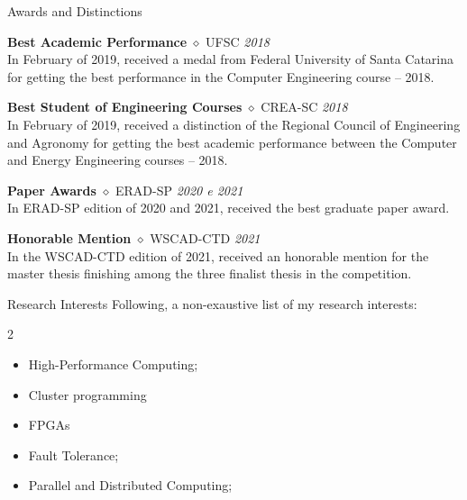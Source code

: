 \documentclass[a4paper]{resume}
\begin{document}
\begin{rSection}{Awards and Distinctions}


{\bf Best Academic Performance} $\diamond$ {UFSC} \hfill{\em 2018} \\
In February of 2019, received a medal from Federal University of Santa Catarina for getting the best 
performance in the Computer Engineering course -- 2018.

{\bf Best Student of Engineering Courses} $\diamond$ {CREA-SC} \hfill{\em 2018} \\
In February of 2019, received a distinction of the Regional Council of Engineering and Agronomy
for getting the best academic performance between the Computer and Energy Engineering courses -- 2018.

{\bf Paper Awards} $\diamond$ {ERAD-SP} \hfill{\em 2020 e 2021} \\
In ERAD-SP edition of 2020 and 2021, received the best graduate paper award.

{\bf Honorable Mention} $\diamond$ {WSCAD-CTD} \hfill{\em 2021} \\
In the WSCAD-CTD edition of 2021, received an honorable mention for the master thesis finishing among the three finalist thesis in the competition. 

\end{rSection}

\begin{rSection}{Research Interests}
Following, a non-exaustive list of my research interests:

\setlength\multicolsep{5pt}
\begin{multicols}{2}
\begin{itemize}[noitemsep]
  \item High-Performance Computing;
  \item Cluster programming
  \item FPGAs
  \item Fault Tolerance;
  \item Parallel and Distributed Computing;
\end{itemize}
\end{multicols}

\end{rSection}
\end{document}

